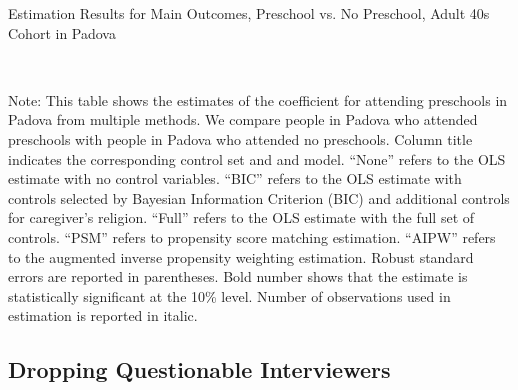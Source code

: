 \begin{table}[H] \caption{Estimation Results for Main Outcomes, Preschool vs. No Preschool, Adult 40s Cohort in Padova} \label{ols-M-adult40-reg-pres-padova}
\scalebox{0.7}{}
\vspace{1ex} \\
\footnotesize\raggedright{Note: This table shows the estimates of the coefficient for attending preschools in Padova from multiple methods. We compare people in Padova who attended preschools with people in Padova who attended no preschools. Column title indicates the corresponding control set and and model. ``None'' refers to the OLS estimate with no control variables. ``BIC'' refers to the OLS estimate with controls selected by Bayesian Information Criterion (BIC) and additional controls for caregiver's religion. ``Full'' refers to the OLS estimate with the full set of controls. ``PSM'' refers to propensity score matching estimation. ``AIPW'' refers to the augmented inverse propensity weighting estimation. Robust standard errors are reported in parentheses. Bold number shows that the estimate is statistically significant at the 10\% level. Number of observations used in estimation is reported in italic.}

\end{table}















\subsection{Dropping Questionable Interviewers}



